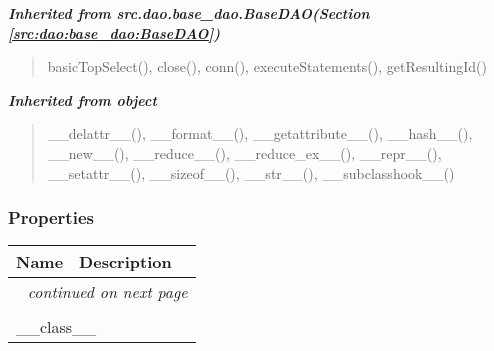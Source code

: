 \large{\textbf{\textit{Inherited from src.dao.base\_dao.BaseDAO\textit{(Section \ref{src:dao:base_dao:BaseDAO})}}}}

\begin{quote}
basicTopSelect(), close(), conn(), executeStatements(), getResultingId()
\end{quote}

\large{\textbf{\textit{Inherited from object}}}

\begin{quote}
\_\_delattr\_\_(), \_\_format\_\_(), \_\_getattribute\_\_(), \_\_hash\_\_(), \_\_new\_\_(), \_\_reduce\_\_(), \_\_reduce\_ex\_\_(), \_\_repr\_\_(), \_\_setattr\_\_(), \_\_sizeof\_\_(), \_\_str\_\_(), \_\_subclasshook\_\_()
\end{quote}


  \subsubsection{Properties}

    \vspace{-1cm}
\hspace{\varindent}\begin{longtable}{|p{\varnamewidth}|p{\vardescrwidth}|l}
\cline{1-2}
\cline{1-2} \centering \textbf{Name} & \centering \textbf{Description}& \\
\cline{1-2}
\endhead\cline{1-2}\multicolumn{3}{r}{\small\textit{continued on next page}}\\\endfoot\cline{1-2}
\endlastfoot\multicolumn{2}{|l|}{\textit{Inherited from object}}\\
\multicolumn{2}{|p{\varwidth}|}{\raggedright \_\_class\_\_}\\
\cline{1-2}
\end{longtable}

